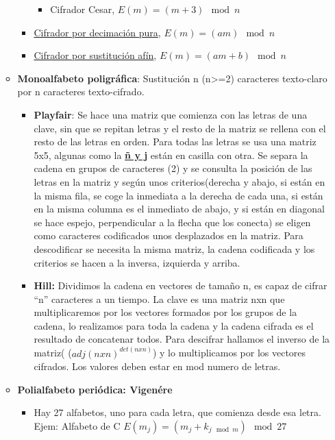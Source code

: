 \documentclass[12pt, twoside, openright]{report} %
\begin{document}
\begin{itemize}
\begin{itemize}
\begin{itemize}
			                  \begin{itemize}
				                  \item Cifrador Cesar, $E(m)=(m+3) \mod n$
			                  \end{itemize}
			            \item \underline{Cifrador por decimación pura}, $E(m)=(am) \mod n$
			            \item \underline{Cifrador por sustitución afín}, $E(m)=(am+b) \mod n$
		            \end{itemize}
		      \item \textbf{Monoalfabeto poligráfica}: Sustitución n (n\textgreater=2) caracteres texto-claro por n caracteres texto-cifrado.
		            \begin{itemize}
			            \item \textbf{Playfair}: Se hace una matriz que comienza con las letras de una clave, sin que se repitan letras y el resto de la matriz se rellena con el resto de las letras en orden. Para todas las letras se usa una matriz 5x5, algunas como la \textbf{\underline{ñ y j}} están en casilla con otra. Se separa la cadena en grupos de caracteres (2) y se consulta la posición de las letras en la matriz y según unos criterios(derecha y abajo, si están en la misma fila, se coge la inmediata a la derecha de cada una, si están en la misma columna es el inmediato de abajo, y si están en diagonal se hace espejo, perpendicular a la flecha que los conecta) se eligen como caracteres codificados unos desplazados en la matriz. Para descodificar se necesita la misma matriz, la cadena codificada y los criterios se hacen a la inversa, izquierda y arriba.
			            \item \textbf{Hill:} Dividimos la cadena en vectores de tamaño n, es capaz de cifrar \enquote{n} caracteres a un tiempo. La clave es una matriz nxn que multiplicaremos por los vectores formados por los grupos de la cadena, lo realizamos para toda la cadena y la cadena cifrada es el resultado de concatenar todos. Para descifrar hallamos el inverso de la matriz( ($adj(nxn)^{det(nxn)}$) y lo multiplicamos por los vectores cifrados. Los valores deben estar en mod numero de letras.
		            \end{itemize}
		      \item \textbf{Polialfabeto periódica: Vigenére}
		            \begin{itemize}
			            \item Hay 27 alfabetos, uno para cada letra, que comienza desde esa letra. Ejem: Alfabeto de C $E(m_j) = (m_j+k_{j \mod m}) \mod 27$

\end{itemize}
\end{itemize}
\end{itemize}
\end{document}
